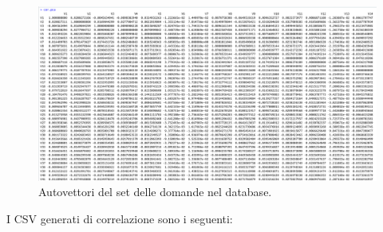 \begin{figure}[H]
\centering
	\includegraphics[width=1\linewidth]{../../PCA/plot/correlazione_rete-db.png}
	\caption{Autovettori del set delle domande nel database.}
	\label{Autovettori del set delle domande nel database.}
\end{figure}
\noindent

I CSV generati di correlazione sono i seguenti:

